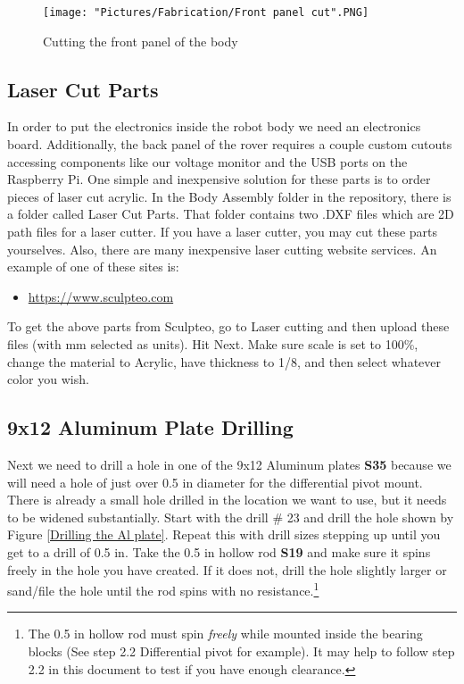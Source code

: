 \documentclass[12pt]{article}
\begin{document}
\begin{figure}[H]
	\centering
	\texttt{[image: "Pictures/Fabrication/Front panel cut".PNG]}
  	\caption{Cutting the front panel of the body}
  	\label{fb panel cut}
\end{figure}


\subsection{Laser Cut Parts}

In order to put the electronics inside the robot body we need an electronics board.  Additionally, the back panel of the rover requires a couple custom cutouts accessing components like our voltage monitor and the USB ports on the Raspberry Pi. One simple and inexpensive solution for these parts is to order pieces of laser cut acrylic. In the Body Assembly folder in the repository, there is a folder called Laser Cut Parts. That folder contains two .DXF files which are 2D path files for a laser cutter.  If you have a laser cutter, you may cut these parts yourselves.  Also, there are many inexpensive laser cutting website services. An example of one of these sites is:

\begin{itemize}
	\item \href{https://www.sculpteo.com}{https://www.sculpteo.com}
\end{itemize}

To get the above parts from Sculpteo, go to Laser cutting and then upload these files (with mm selected as units). Hit Next. Make sure scale is set to 100\%, change the material to Acrylic, have thickness to 1/8, and then select whatever color you wish. 


\subsection{9x12 Aluminum Plate Drilling}
Next we need to drill a hole in one of the 9x12 Aluminum plates \textbf{S35} because we will need a hole of just over 0.5 in diameter for the differential pivot mount. There is already a small hole drilled in the location we want to use, but it needs to be widened substantially. Start with the drill \# 23 and drill the hole shown by Figure \ref{Drilling the Al plate}. Repeat this with drill sizes stepping up until you get to a drill of 0.5 in. Take the 0.5 in hollow rod \textbf{S19} and make sure it spins freely in the hole you have created. If it does not, drill the hole slightly larger or sand/file the hole until the rod spins with no resistance.\footnote{The 0.5 in hollow rod must spin \textit{freely} while mounted inside the bearing blocks (See step 2.2 Differential pivot for example). It may help to follow step 2.2 in this document to test if you have enough clearance.} 
\end{document}
